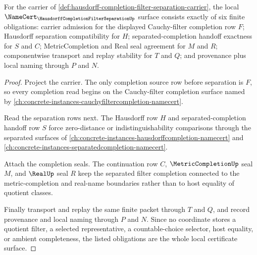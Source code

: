 \begin{theorem}
\label{thm:hausdorff-completion-filter-separation-namecert-obligations}
For the carrier of \autoref{def:hausdorff-completion-filter-separation-carrier}, the local $\NameCert_{\HausdorffCompletionFilterSeparationUp}$ surface consists exactly of six finite obligations: carrier admission for the displayed Cauchy-filter completion row $F$; Hausdorff separation compatibility for $H$; separated-completion handoff exactness for $S$ and $C$; MetricCompletion and Real seal agreement for $M$ and $R$; componentwise transport and replay stability for $T$ and $Q$; and provenance plus local naming through $P$ and $N$.
\end{theorem}
\begin{proof}
Project the carrier. The only completion source row before separation is $F$, so every completion read begins on the Cauchy-filter completion surface named by \autoref{ch:concrete-instances-cauchyfiltercompletion-namecert}.

Read the separation rows next. The Hausdorff row $H$ and separated-completion handoff row $S$ force zero-distance or indistinguishability comparisons through the separated surfaces of \autoref{ch:concrete-instances-hausdorffcompletion-namecert} and \autoref{ch:concrete-instances-separatedcompletion-namecert}.

Attach the completion seals. The continuation row $C$, $\MetricCompletionUp$ seal $M$, and $\RealUp$ seal $R$ keep the separated filter completion connected to the metric-completion and real-name boundaries rather than to host equality of quotient classes.

Finally transport and replay the same finite packet through $T$ and $Q$, and record provenance and local naming through $P$ and $N$. Since no coordinate stores a quotient filter, a selected representative, a countable-choice selector, host equality, or ambient completeness, the listed obligations are the whole local certificate surface.
\end{proof}

